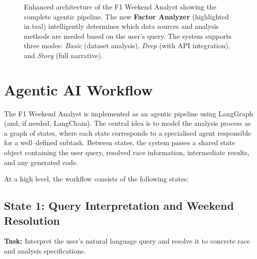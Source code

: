 \documentclass[11pt]{article}
\begin{document}
\begin{figure}[p]
    \caption{Enhanced architecture of the F1 Weekend Analyst showing the complete agentic pipeline. The new \textbf{Factor Analyzer} (highlighted in teal) intelligently determines which data sources and analysis methods are needed based on the user's query. The system supports three modes: \textit{Basic} (dataset analysis), \textit{Deep} (with API integration), and \textit{Story} (full narrative).}
    \label{fig:pipeline}
\end{figure}

\clearpage

\section{Agentic AI Workflow}

The F1 Weekend Analyst is implemented as an agentic pipeline using LangGraph (and, if needed, LangChain). The central idea is to model the analysis process as a graph of states, where each state corresponds to a specialised agent responsible for a well–defined subtask. Between states, the system passes a shared state object containing the user query, resolved race information, intermediate results, and any generated code.

At a high level, the workflow consists of the following states:

\subsection*{State 1: Query Interpretation and Weekend Resolution}

\textbf{Task:} Interpret the user's natural language query and resolve it to concrete race and analysis specifications.
\end{document}
